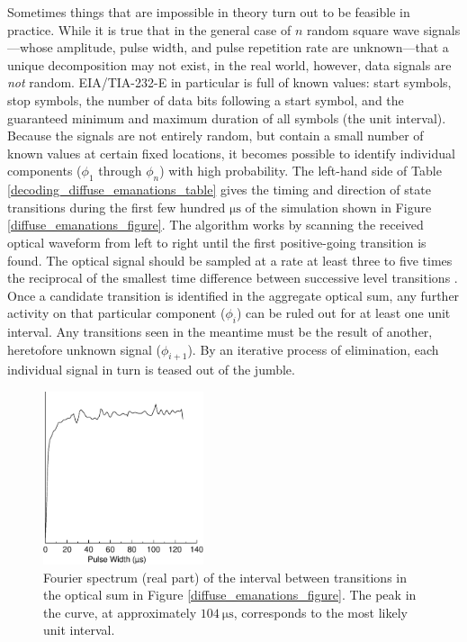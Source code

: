 \documentclass{acmtrans2e}
\begin{document}
Sometimes things that are impossible in theory turn out to be feasible
in practice.  While it is true that in the general case of $n$ random square
wave signals---whose amplitude, pulse width, and pulse repetition rate are
unknown---that a unique decomposition may not exist, in the real world, however,
data signals are {\it not} random.  EIA/TIA-232-E in particular is full
of known values: start symbols, stop symbols, the number of data bits following
a start symbol, and the guaranteed minimum and maximum duration of all symbols
(the unit interval).  Because the signals are not entirely random, but contain
a small number of known values at certain fixed locations, it becomes possible
to identify individual components ($\phi_1$ through $\phi_n$) with high
probability.  The left-hand side of Table \ref{decoding_diffuse_emanations_table}
gives the timing and direction of state transitions during the first few hundred
$\mathrm{\mu s}$ of the simulation shown in Figure \ref{diffuse_emanations_figure}.
The algorithm works by scanning the received optical waveform from left to
right until the first positive-going transition is found.  The optical signal
should be sampled at a rate at least three to five times the reciprocal of the
smallest time difference between successive level transitions \cite{McCarthy}.
Once a candidate transition is identified in the aggregate optical sum, any further
activity on that particular component ($\phi_i$) can be ruled out for at least
one unit interval.  Any transitions seen in the meantime must be the result of
another, heretofore unknown signal ($\phi_{i+1}$).  By an iterative process of
elimination, each individual signal in turn is teased out of the jumble.

\begin{figure}
\centering
\includegraphics[height=2in]{Figure_8.75.eps}
\caption{Fourier spectrum (real part) of the interval between transitions
in the optical sum in Figure
\ref{diffuse_emanations_figure}.  The peak in the curve, at approximately
$104 \ \mathrm{\mu s}$, corresponds to the most likely unit interval.}
\label{fourier_spectrum_figure}
\end{figure}
\end{document}
